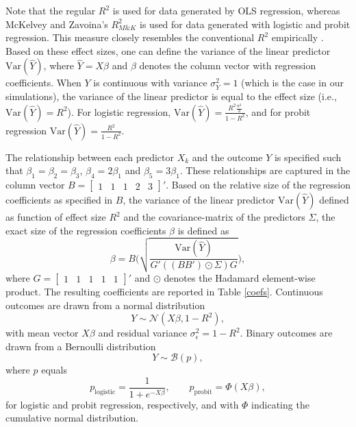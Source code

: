 \documentclass[11pt,reqno]{article}
\begin{document}
\begin{appendices}
Note that the regular $R^2$ is used for data generated by OLS regression, whereas McKelvey and Zavoina's $R^2_{M\&K}$ \autocite*{mckelvey_zavoina_1975} is used for data generated with logistic and probit regression. This measure closely resembles the conventional $R^2$ empirically \autocite{hagle_mitchell_goodness_1992, demaris_explained_2002}.
Based on these effect sizes, one can define the variance of the linear predictor $\text{Var}(\hat{Y})$, where $\hat{Y} = X\beta$ and $\beta$ denotes the column vector with regression coefficients.
When $Y$ is continuous with variance $\sigma^2_Y = 1$ (which is the case in our simulations), the variance of the linear predictor is equal to the effect size (i.e., $\text{Var}(\hat{Y}) = R^2$).
For logistic regression, $\text{Var}(\hat{Y}) = \frac{R^2 \frac{\pi^2}{3}}{1-R^2}$, and for probit regression $\text{Var}(\hat{Y}) = \frac{R^2}{1 - R^2}$.

The relationship between each predictor $X_k$ and the outcome $Y$ is specified such that $\beta_1 = \beta_2 = \beta_3$, $\beta_4 = 2\beta_1$ and $\beta_5 = 3\beta_1$.
These relationships are captured in the column vector $B = \begin{bmatrix} 1 & 1 & 1 & 2 & 3 \end{bmatrix}'$.
Based on the relative size of the regression coefficients as specified in $B$, the variance of the linear predictor $\text{Var}(\hat{Y})$ defined as function of effect size $R^2$ and the covariance-matrix of the predictors $\Sigma$, the exact size of the regression coefficients $\beta$ is defined as
\begin{equation}
\beta = B \Bigg(\sqrt{\frac{\text{Var}(\hat{Y})}{G' ((B B') \odot \Sigma) G }}\Bigg),
\end{equation}
where $G = \begin{bmatrix} 1 & 1 & 1 & 1 & 1 \end{bmatrix}'$ and $\odot$ denotes the Hadamard element-wise product. The resulting coefficients are reported in Table \ref{coefs}.
Continuous outcomes are drawn from a normal distribution
\begin{equation}
Y \sim \mathcal{N}(X\beta, 1 - R^2),
\end{equation}
with mean vector $X \beta$ and residual variance $\sigma_{\epsilon}^2 = 1 - R^2$.
Binary outcomes are drawn from a Bernoulli distribution
\begin{equation}
Y \sim \mathcal{B}(p),
\end{equation}
where $p$ equals
\begin{equation}
p_{\text{logistic}} = \frac{1}{1 + e^{-X\beta}},
~~~~~~~~~
p_{\text{probit}} = \Phi(X\beta),
\end{equation}
for logistic and probit regression, respectively, and with $\Phi$ indicating the cumulative normal distribution.


\end{appendices}
\end{document}
